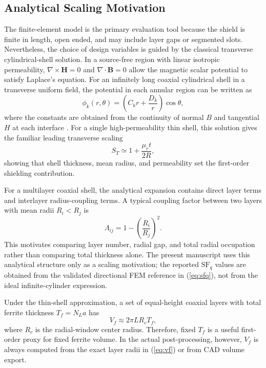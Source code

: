 ﻿\documentclass[letterpaper,journal]{IEEEtran}
\begin{document}
\subsection{Analytical Scaling Motivation}

The finite-element model is the primary evaluation tool because the shield is finite in length, open ended, and may include layer gaps or segmented slots. Nevertheless, the choice of design variables is guided by the classical transverse cylindrical-shell solution. In a source-free region with linear isotropic permeability, $\nabla\times\mathbf{H}=0$ and $\nabla\cdot\mathbf{B}=0$ allow the magnetic scalar potential to satisfy Laplace's equation. For an infinitely long coaxial cylindrical shell in a transverse uniform field, the potential in each annular region can be written as
\begin{equation}
\phi_k(r,\theta)=\left(C_k r+\frac{D_k}{r}\right)\cos\theta ,
\label{eq:scalarpotential}
\end{equation}
where the constants are obtained from the continuity of normal $B$ and tangential $H$ at each interface \cite{ref6}. For a single high-permeability thin shell, this solution gives the familiar leading transverse scaling
\begin{equation}
S_T \simeq 1+\frac{\mu_r t}{2R},
\label{eq:singlelayerscaling}
\end{equation}
showing that shell thickness, mean radius, and permeability set the first-order shielding contribution.

For a multilayer coaxial shell, the analytical expansion contains direct layer terms and interlayer radius-coupling terms. A typical coupling factor between two layers with mean radii $R_i<R_j$ is
\begin{equation}
\Lambda_{ij}=1-\left(\frac{R_i}{R_j}\right)^2 .
\label{eq:couplingfactor}
\end{equation}
This motivates comparing layer number, radial gap, and total radial occupation rather than comparing total thickness alone. The present manuscript uses this analytical structure only as a scaling motivation; the reported $\mathrm{SF}_q$ values are obtained from the validated directional FEM reference in (\ref{eq:sfq}), not from the ideal infinite-cylinder expression.

Under the thin-shell approximation, a set of equal-height coaxial layers with total ferrite thickness $T_f=N_La$ has
\begin{equation}
V_f\approx 2\pi L R_c T_f ,
\label{eq:vfapprox}
\end{equation}
where $R_c$ is the radial-window center radius. Therefore, fixed $T_f$ is a useful first-order proxy for fixed ferrite volume. In the actual post-processing, however, $V_f$ is always computed from the exact layer radii in (\ref{eq:vf}) or from CAD volume export.
\end{document}
